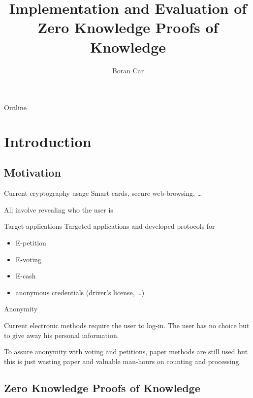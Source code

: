 \documentclass{beamer}
\title[Implementation and Evaluation of ZK-PoK]{Implementation and
  Evaluation of Zero Knowledge Proofs of Knowledge}
\author{Boran Car}
\institute{KU Leuven}
\begin{document}
\newcommand{\secret}[1]{\textcolor{red}{#1}}

\begin{frame}
  \titlepage
\end{frame}

\begin{frame}{Outline}
\end{frame}

\section{Introduction}
\subsection{Motivation}

\begin{frame}{Current cryptography usage}
  Smart cards, secure web-browsing, \ldots

  \vfill

  \pause

  All involve revealing who the user is
\end{frame}

\begin{frame}{Target applications}
  Targeted applications and developed protocols for
  \begin{itemize}
  \pause \item E-petition
  \pause \item E-voting
  \pause \item E-cash
  \pause \item anonymous credentials (driver's license, \ldots)
  \end{itemize}
\end{frame}

\begin{frame}{Anonymity}
  
  Current electronic methods require the user to log-in. The
  user has no choice but to give away his personal information.

  \vrule

  \pause

  To assure anonymity with voting and petitions, paper methods
  are still used but this is just wasting paper and valuable
  man-hours on counting and processing.
\end{frame}

\subsection{Zero Knowledge Proofs of Knowledge}
\end{document}

